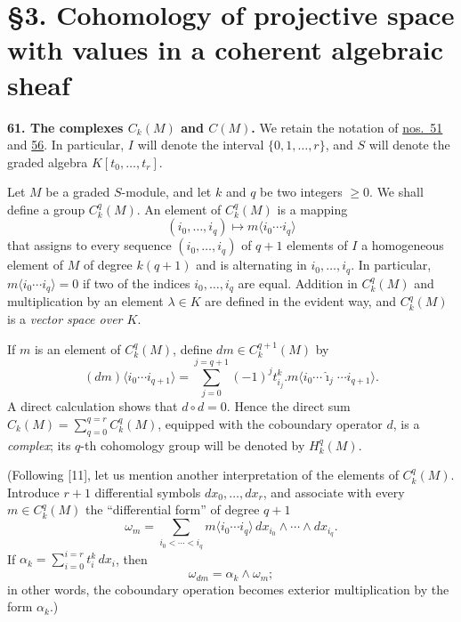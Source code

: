 
\label{fac:III:3}
\section*{\S3. Cohomology of projective space with values in a coherent
algebraic sheaf}

\label{fac:III:3:no:61}
\textbf{61. The complexes $C_k(M)$ and $C(M)$.}
We retain the notation of \hyperref[fac:III:1:no:51]{nos.~51} and
\hyperref[fac:III:2:no:56]{56}. In particular, $I$ will denote the
interval $\{0,1,\ldots,r\}$, and $S$ will denote the graded algebra
$K[t_0,\ldots,t_r]$.

Let $M$ be a graded $S$-module, and let $k$ and $q$ be two integers
$\geq0$. We shall define a group $C^q_k(M)$. An element of $C^q_k(M)$ is
a mapping
\label{fac:III:3:no:61:formula:cochain-value}
\[
(i_0,\ldots,i_q)\longmapsto m\langle i_0\cdots i_q\rangle
\]
that assigns to every sequence $(i_0,\ldots,i_q)$ of $q+1$ elements of
$I$ a homogeneous element of $M$ of degree $k(q+1)$ and is alternating
in $i_0,\ldots,i_q$. In particular,
$m\langle i_0\cdots i_q\rangle=0$ if two of the indices
$i_0,\ldots,i_q$ are equal. Addition in $C^q_k(M)$ and multiplication by
an element $\lambda\in K$ are defined in the evident way, and $C^q_k(M)$
is a \textit{vector space over $K$}.

If $m$ is an element of $C^q_k(M)$, define $dm\in C^{q+1}_k(M)$ by
\label{fac:III:3:no:61:formula:differential}
\[
(dm)\langle i_0\cdots i_{q+1}\rangle
=\sum_{j=0}^{j=q+1}(-1)^j t_{i_j}^k.
  m\langle i_0\cdots\widehat{\imath}_j\cdots i_{q+1}\rangle.
\]
\label{fac:III:3:no:61:formula:complex-Ck}
A direct calculation shows that $d\circ d=0$. Hence the direct sum
$C_k(M)=\sum_{q=0}^{q=r}C^q_k(M)$, equipped with the coboundary operator
$d$, is a \textit{complex}; its $q$-th cohomology group will be denoted
by $H^q_k(M)$.

(Following [11], let us mention another interpretation of the elements
of $C^q_k(M)$. Introduce $r+1$ differential symbols
$dx_0,\ldots,dx_r$, and associate with every $m\in C^q_k(M)$ the
``differential form'' of degree $q+1$
\label{fac:III:3:no:61:formula:omega-m}
\[
\omega_m=\sum_{i_0<\cdots<i_q}
m\langle i_0\cdots i_q\rangle\,
dx_{i_0}\wedge\cdots\wedge dx_{i_q}.
\]
\label{fac:III:3:no:61:formula:alpha-k}
If $\alpha_k=\sum_{i=0}^{i=r}t_i^k\,dx_i$, then
\label{fac:III:3:no:61:formula:omega-dm}
\[
\omega_{dm}=\alpha_k\wedge\omega_m;
\]
in other words, the coboundary operation becomes exterior
multiplication by the form $\alpha_k$.)

